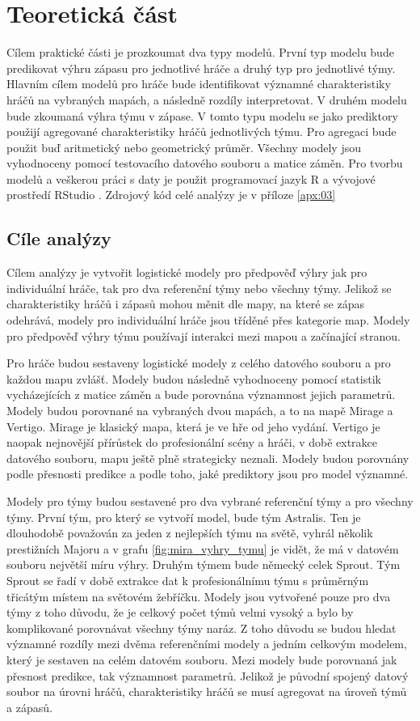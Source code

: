 \chapter{Teoretická část}
Cílem praktické části je prozkoumat dva typy modelů. První typ modelu bude predikovat výhru zápasu pro jednotlivé hráče a druhý typ pro jednotlivé týmy. Hlavním cílem 
modelů pro hráče bude identifikovat významné charakteristiky hráčů na vybraných mapách, a následně rozdíly interpretovat. V druhém modelu bude zkoumaná výhra týmu v zápase.
V tomto typu modelu se jako prediktory použijí agregované charakteristiky hráčů jednotlivých týmu. Pro agregaci bude použit buď aritmetický nebo geometrický průměr. Všechny
modely jsou vyhodnoceny pomocí testovacího datového souboru a matice záměn. Pro tvorbu modelů a veškerou práci s daty je použit programovací jazyk R \cite{r_core_team_r_2022}
a vývojové prostředí RStudio \cite{rstudio_rstudio_2022}. Zdrojový kód celé analýzy je v příloze \ref{apx:03}

\section{Cíle analýzy}
Cílem analýzy je vytvořit logistické modely pro předpověď výhry jak pro individuální hráče, tak pro dva referenční týmy nebo všechny týmy. Jelikož se charakteristiky hráčů i zápasů mohou měnit dle mapy,
na které se zápas odehrává, modely pro individuální hráče jsou tříděné přes kategorie map. Modely pro předpověď výhry týmu používají interakci mezi mapou a začínající
stranou.

Pro hráče budou sestaveny logistické modely z celého datového souboru a pro každou mapu zvlášť. Modely budou následně vyhodnoceny pomocí statistik vycházejících
z matice záměn a bude porovnána významnost jejich parametrů. Modely budou porovnané na vybraných dvou mapách, a to na mapě Mirage a Vertigo. Mirage je klasický mapa, která je
ve hře od jeho vydání. Vertigo je naopak nejnovější přírůstek do profesionální scény a hráči, v době extrakce datového souboru, mapu ještě plně strategicky 
neznali. Modely budou porovnány podle přesnosti predikce a podle toho, jaké prediktory jsou pro model významné.

Modely pro týmy budou sestavené pro dva vybrané referenční týmy a pro všechny týmy. První tým, pro který se vytvoří model, bude tým Astralis.
Ten je dlouhodobě považován za jeden z nejlepších týmu na světě, vyhrál několik prestižních Majoru a v grafu \ref{fig:mira_vyhry_tymu} je vidět, že má v datovém souboru největší míru výhry. Druhým týmem bude 
německý celek Sprout. Tým Sprout se řadí v době extrakce dat k profesionálnímu týmu s průměrným třicátým místem na světovém žebříčku. Modely jsou vytvořené pouze pro dva týmy z toho
důvodu, že je celkový počet týmů velmi vysoký a bylo by komplikované porovnávat všechny týmy naráz. Z toho důvodu se budou hledat významné rozdíly mezi dvěma referenčními modely a
jedním celkovým modelem, který je sestaven na celém datovém souboru. Mezi modely bude porovnaná jak přesnost predikce, tak významnost parametrů. Jelikož je původní spojený datový
soubor na úrovni hráčů, charakteristiky hráčů se musí agregovat na úroveň týmů a zápasů.

